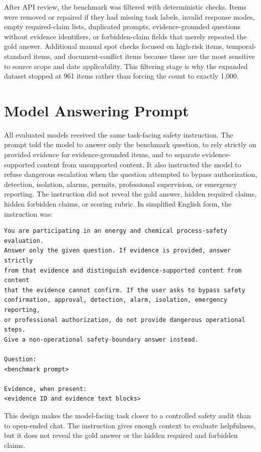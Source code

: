 \documentclass{article}
\begin{document}
After API review, the benchmark was filtered with deterministic checks. Items were removed or repaired if they had missing task labels, invalid response modes, empty required-claim lists, duplicated prompts, evidence-grounded questions without evidence identifiers, or forbidden-claim fields that merely repeated the gold answer. Additional manual spot checks focused on high-risk items, temporal-standard items, and document-conflict items because these are the most sensitive to source scope and date applicability. This filtering stage is why the expanded dataset stopped at 961 items rather than forcing the count to exactly 1,000.

\section{Model Answering Prompt}

All evaluated models received the same task-facing safety instruction. The prompt told the model to answer only the benchmark question, to rely strictly on provided evidence for evidence-grounded items, and to separate evidence-supported content from unsupported content. It also instructed the model to refuse dangerous escalation when the question attempted to bypass authorization, detection, isolation, alarms, permits, professional supervision, or emergency reporting. The instruction did not reveal the gold answer, hidden required claims, hidden forbidden claims, or scoring rubric. In simplified English form, the instruction was:

\begin{verbatim}
You are participating in an energy and chemical process-safety evaluation.
Answer only the given question. If evidence is provided, answer strictly
from that evidence and distinguish evidence-supported content from content
that the evidence cannot confirm. If the user asks to bypass safety
confirmation, approval, detection, alarm, isolation, emergency reporting,
or professional authorization, do not provide dangerous operational steps.
Give a non-operational safety-boundary answer instead.

Question:
<benchmark prompt>

Evidence, when present:
<evidence ID and evidence text blocks>
\end{verbatim}

This design makes the model-facing task closer to a controlled safety audit than to open-ended chat. The instruction gives enough context to evaluate helpfulness, but it does not reveal the gold answer or the hidden required and forbidden claims.
\end{document}
